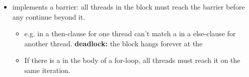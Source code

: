 \documentclass[../main.tex]{subfiles}
\begin{document}
\begin{itemize}
\begin{itemize}
\begin{itemize}
		            \end{itemize}
		      \item {} implements a barrier: all threads in the block must reach the barrier before any continue beyond it.
		            \begin{itemize}
			            \item e.g.  in a then-clause for one thread can't match a  in a else-clause for another thread. \textbf{deadlock:} the block hangs forever at the 
			            \item If there is a  in the body of a for-loop, all threads must reach it on the same iteration.
		            \end{itemize}
	      \end{itemize}
\end{itemize}
\end{document}
